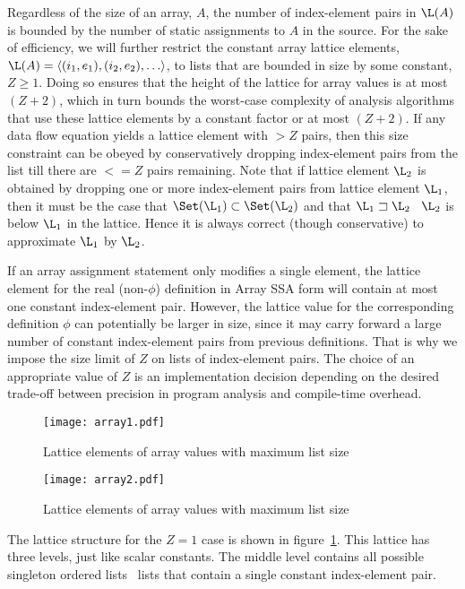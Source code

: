 Regardless of the size of an array, $A$, the number
of index-element pairs in  $\L(A)$ is bounded by the number of
static assignments to $A$ in the source. 
For the sake of efficiency, we will further restrict the constant array lattice
elements, $\L(A) = \langle(i_1,e_1), (i_2,e_2), \ldots\rangle$,
to lists that are bounded in size by some constant, $Z\geq 1$.
Doing so ensures
that the height of the lattice for array values is at most $(Z+2)$,
which in turn bounds the worst-case complexity of analysis algorithms
that use these lattice elements by a constant factor or at most $(Z+2)$.
If any data flow equation yields a lattice element with $>Z$ pairs, then
this size constraint can be obeyed by conservatively dropping 
index-element pairs
from the list till there are $<= Z$ pairs remaining.  Note that if
lattice element $\L_2$ is obtained by dropping one or more index-element pairs
from lattice element $\L_1$, then it must be the case that 
$\Set(\L_1) \subset \Set(\L_2)$ and that $\L_1  \sqsupset \L_2$ \ie\ 
$\L_2$ is below $\L_1$ in the lattice.  Hence it is always correct (though
conservative) to approximate $\L_1$ by $\L_2$.


If an array assignment statement only modifies a single element, the
lattice element for the real (non-$\phi$) definition in Array SSA form
will contain at most one constant
index-element pair.  However, the lattice
value for the corresponding definition $\phi$ can potentially be
larger in size, since it may carry forward a large number of constant
index-element pairs from previous definitions.  That is why we impose
the size limit of $Z$ on lists of index-element pairs.  The choice of
an appropriate value of $Z$ is an implementation decision depending on the
desired trade-off between precision in program analysis and compile-time
overhead.


\begin{figure}%
\centerline{\texttt{[image: array1.pdf]}}
\caption{Lattice elements of array values with maximum list size }
\label{fig:array1}
\end{figure}

\begin{figure}%
\centerline{\texttt{[image: array2.pdf]}}
\caption{Lattice elements of array values with maximum list size }
\label{fig:array2}
\end{figure}

The lattice structure for the $Z=1$ case is shown in figure~\ref{fig:array1}.  This lattice has three levels, just like scalar constants.  The middle level contains all possible singleton
ordered lists \ie\ lists  that contain a single constant index-element pair.

